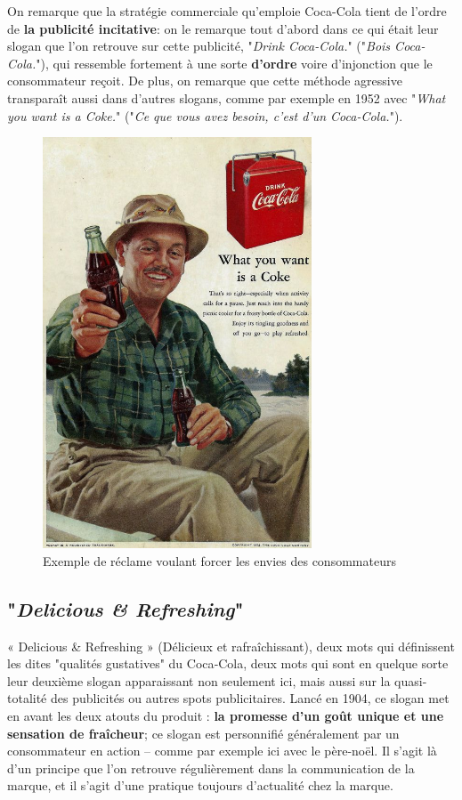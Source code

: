 On remarque que la stratégie commerciale qu'emploie Coca-Cola tient de l'ordre de \textbf{la publicité incitative}:
on le remarque tout d'abord dans ce qui était leur slogan que l'on retrouve sur cette publicité, "\textit{Drink Coca-Cola.}" ("\textit{Bois Coca-Cola.}"), qui ressemble fortement à une sorte \textbf{d'ordre} voire d'injonction que le consommateur reçoit. De plus, on remarque que cette méthode agressive transparaît aussi dans d'autres slogans, comme par exemple en 1952 avec "\textit{What you want is a Coke.}" ("\textit{Ce que vous avez besoin, c'est d'un Coca-Cola.}").

\begin{figure}[th]
\centering
\includegraphics[width=80mm]{medias/poster_coca}
\decoRule
\caption{Exemple de réclame voulant forcer les envies des consommateurs }
\end{figure}
\newpage

\subsection{"\textit{Delicious \& Refreshing}"}

« Delicious \& Refreshing » (Délicieux et rafraîchissant), deux mots qui définissent les dites "qualités gustatives" du Coca‑Cola, deux mots qui sont en quelque sorte leur deuxième slogan apparaissant non seulement ici, mais aussi sur la quasi-totalité des publicités ou autres spots publicitaires.
Lancé en 1904, ce slogan met en avant les deux atouts du produit : \textbf{la promesse d'un goût unique et une sensation de fraîcheur}; ce slogan est personnifié généralement par un consommateur en action – comme par exemple ici avec le père-noël. Il s'agit là d'un principe que l’on retrouve régulièrement dans la communication de la marque, et il s'agit d'une pratique toujours d'actualité chez la marque.

